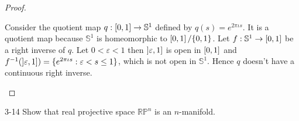 \begin{proof}
\begin{enumerate}[label={(\alph*)}]
		      Consider the quotient map $q: \left[{0, 1}\right]\to \mathbb{S}^{1}$ defined by $q(s) = e^{2\pi\iota s}$. It is a quotient map because $\mathbb{S}^{1}$ is homeomorphic to $\left[{0, 1}\right]/\{ 0, 1 \}$. Let $f: \mathbb{S}^{1}\to \left[{0, 1}\right]$ be a right inverse of $q$. Let $0 < \varepsilon < 1$ then $\left]{\varepsilon, 1}\right]$ is open in $\left[{0, 1}\right]$ and $f^{-1}(\left]{\varepsilon, 1}\right]) = \{ e^{2\pi\iota s}: \varepsilon < s \leq 1 \}$, which is not open in $\mathbb{S}^{1}$. Hence $q$ doesn't have a continuous right inverse.
	\end{enumerate}
\end{proof}

\begin{problem}{3-14}\label{problem:3-14}
Show that real projective space $\mathbb{RP}^{n}$ is an $n$-manifold.
\end{problem}

